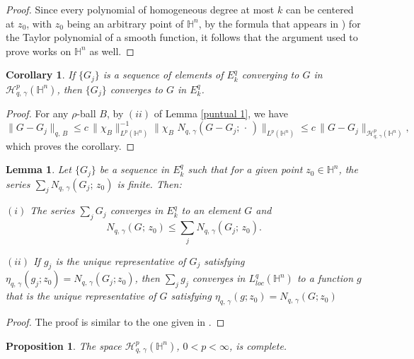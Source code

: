 \documentclass[reqno,10pt]{article}
\newtheorem{lemma}[theorem]{Lemma}
\newtheorem{corollary}[theorem]{Corollary}
\newtheorem{proposition}[theorem]{Proposition}
\theoremstyle{definition}
\numberwithin{equation}{section}
\numberwithin{theorem}{section}
\begin{document}
\begin{proof} Since every polynomial of homogeneous degree at most $k$ can be centered at $z_0$, with $z_0$ being an arbitrary point of 
$\mathbb{H}^n$, by the formula that appears in \cite[Section 5.2, p. 272]{Bonfi}) for the Taylor polynomial of a smooth function, it follows that the argument used to prove \cite[Lemma 3]{segovia} works on $\mathbb{H}^n$ as well.
\end{proof}

\begin{corollary} If $\{ G_{j} \}$ is a sequence of elements of $E^{q}_{k}$ converging to $G$ in 
$\mathcal{H}^{p}_{q, \, \gamma}(\mathbb{H}^{n})$, then $\{ G_{j} \}$ converges to $G$ in $E^{q}_{k}$.
\end{corollary}

\begin{proof} For any $\rho$-ball $B$, by $(ii)$ of Lemma \ref{puntual 1}, we have
\[
\| G- G_{j} \|_{q, \, B} \leq c \, \| \chi_{B} \|_{L^p(\mathbb{H}^{n})}^{-1} 
\| \chi_{B} \,\, N_{q, \, \gamma}(G - G_{j}; \, \cdot \,) \|_{L^p(\mathbb{H}^{n})} 
\leq c \, \| G - G_{j} \|_{\mathcal{H}^{p}_{q, \, \gamma}(\mathbb{H}^{n})},
\]
which proves the corollary.
\end{proof}

\begin{lemma} \label{series in Eqk} Let $\{ G_{j} \}$ be a sequence in $E^{q}_{k}$ such that for a given point $z_0 \in \mathbb{H}^n$, the series 
$\sum_j N_{q, \, \gamma}(G_{j}; \, z_0 )$ is finite. Then:

$(i)$ The series $\sum_j G_j$ converges in $E_{k}^{q}$ to an element $G$ and 
\[
N_{q, \, \gamma}(G; \, z_0 ) \leq \sum_j N_{q, \, \gamma}(G_{j}; \, z_0 ).
\]

$(ii)$ If $g_j$ is the unique representative of $G_j$ satisfying
$\eta_{q, \, \gamma} (g_j; z_0) = N_{q, \, \gamma}(G_j; z_0)$, then $\sum_j g_j$ converges in $L^{q}_{loc}(\mathbb{H}^{n})$ to a function 
$g$ that is the unique representative of $G$ satisfying $\eta_{q, \, \gamma} (g; z_0) = N_{q, \, \gamma}(G; z_0)$
\end{lemma}

\begin{proof} The proof is similar to the one given in \cite[Lemma 4]{segovia}.
\end{proof}


\begin{proposition} \label{cerrado} The space $\mathcal{H}^{p}_{q, \, \gamma}(\mathbb{H}^{n})$, $0 < p < \infty$, is complete.
\end{proposition}
\end{document}
